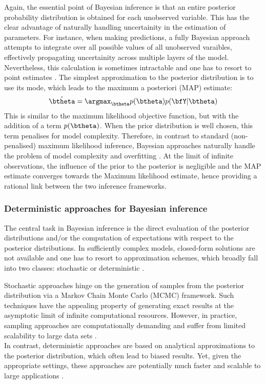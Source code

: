 Again, the essential point of Bayesian inference is that an entire posterior probability distribution is obtained for each unobserved variable. This has the clear advantage of naturally handling uncertainity in the estimation of parameters. For instance, when making predictions, a fully Bayesian approach attempts to integrate over all possible values of all unobserved varaibles, effectively propagating uncertainity across multiple layers of the model. Nevertheless, this calculation is sometimes intractable and one has to resort to point estimates \cite{Bishop2006,Murphy,Gelman2013}. The simplest approximation to the posterior distribution is to use its mode, which leads to the maximum a posteriori (MAP) estimate:
\[
	\hat{\btheta} = \argmax_{\btheta} p(\btheta) p(\bfY|\btheta) 
\]
This is similar to the maximum likelihood objective function, but with the addition of a term $p(\btheta)$. When the prior distribution is well chosen, this term penalises for model complexity. Therefore, in contrast to standard (non-penalised) maximum likelihood inference, Bayesian approaches naturally handle the problem of model complexity and overfitting \cite{Bishop2006,Murphy,Gelman2013}. At the limit of infinite observations, the influence of the prior to the posterior is negligible and the MAP estimate converges towards the Maximum likelihood estimate, hence providing a rational link between the two inference frameworks.

\subsubsection{Deterministic approaches for Bayesian inference} \label{section:deterministic_bayesian_inference}
The central task in Bayesian inference is the direct evaluation of the posterior distributions and/or the computation of expectations with respect to the posterior distributions. In sufficiently complex models, closed-form solutions are not available and one has to resort to approximation schemes, which broadly fall into two classes: stochastic or deterministic \cite{Gelman2013,Blei2016}. 

Stochastic approaches hinge on the generation of samples from the posterior distribution via a Markov Chain Monte Carlo (MCMC) framework. Such techniques have the appealing property of generating exact results at the asymptotic limit of infinite computational resources. However, in practice, sampling approaches are computationally demanding and suffer from limited scalability to large data sets \cite{Blei2016}. \\
In contrast, deterministic approaches are based on analytical approximations to the posterior distribution, which often lead to biased results. Yet, given the appropriate settings, these approaches are potentially much faster and scalable to large applications \cite{Bishop2006,Murphy,Blei2016}.

